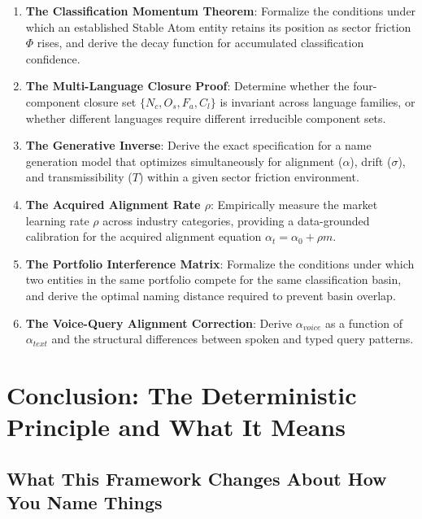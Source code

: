 \documentclass[12pt, openany]{book}
\theoremstyle{thmstyle}
\theoremstyle{defstyle}
\begin{document}
\begin{enumerate}[leftmargin=1.5em]
  \item \textbf{The Classification Momentum Theorem}: Formalize the conditions under which an established Stable Atom entity retains its position as sector friction $\Phi$ rises, and derive the decay function for accumulated classification confidence.
  \item \textbf{The Multi-Language Closure Proof}: Determine whether the four-component closure set $\{N_c, O_s, F_a, C_l\}$ is invariant across language families, or whether different languages require different irreducible component sets.
  \item \textbf{The Generative Inverse}: Derive the exact specification for a name generation model that optimizes simultaneously for alignment ($\alpha$), drift ($\sigma$), and transmissibility ($T$) within a given sector friction environment.
  \item \textbf{The Acquired Alignment Rate $\rho$}: Empirically measure the market learning rate $\rho$ across industry categories, providing a data-grounded calibration for the acquired alignment equation $\alpha_t = \alpha_0 + \rho m$.
  \item \textbf{The Portfolio Interference Matrix}: Formalize the conditions under which two entities in the same portfolio compete for the same classification basin, and derive the optimal naming distance required to prevent basin overlap.
  \item \textbf{The Voice-Query Alignment Correction}: Derive $\alpha_{voice}$ as a function of $\alpha_{text}$ and the structural differences between spoken and typed query patterns.
\end{enumerate}

\chapter*{Conclusion: The Deterministic Principle and What It Means}

\section*{What This Framework Changes About How You Name Things}
\end{document}
